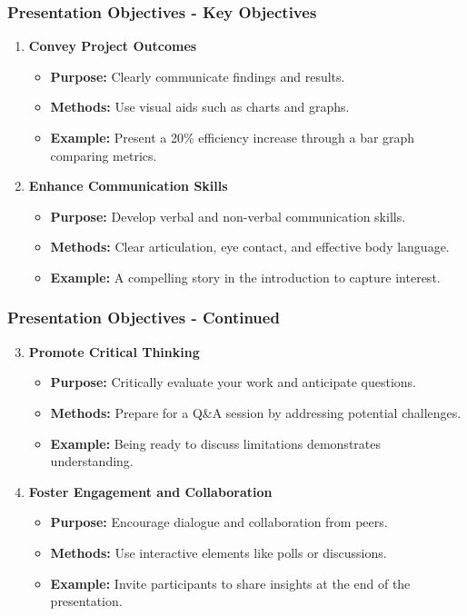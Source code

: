 \documentclass[aspectratio=169]{beamer}
\begin{document}
\begin{frame}[fragile]
    \frametitle{Presentation Objectives - Key Objectives}
    \begin{enumerate}
        \item \textbf{Convey Project Outcomes}
            \begin{itemize}
                \item \textbf{Purpose:} Clearly communicate findings and results.
                \item \textbf{Methods:} Use visual aids such as charts and graphs.
                \item \textbf{Example:} Present a 20\% efficiency increase through a bar graph comparing metrics.
            \end{itemize}
        
        \item \textbf{Enhance Communication Skills}
            \begin{itemize}
                \item \textbf{Purpose:} Develop verbal and non-verbal communication skills.
                \item \textbf{Methods:} Clear articulation, eye contact, and effective body language.
                \item \textbf{Example:} A compelling story in the introduction to capture interest.
            \end{itemize}
    \end{enumerate}
\end{frame}

\begin{frame}[fragile]
    \frametitle{Presentation Objectives - Continued}
    \begin{enumerate}
        \setcounter{enumi}{2} %
        \item \textbf{Promote Critical Thinking}
            \begin{itemize}
                \item \textbf{Purpose:} Critically evaluate your work and anticipate questions.
                \item \textbf{Methods:} Prepare for a Q\&A session by addressing potential challenges.
                \item \textbf{Example:} Being ready to discuss limitations demonstrates understanding.
            \end{itemize}
        
        \item \textbf{Foster Engagement and Collaboration}
            \begin{itemize}
                \item \textbf{Purpose:} Encourage dialogue and collaboration from peers.
                \item \textbf{Methods:} Use interactive elements like polls or discussions.
                \item \textbf{Example:} Invite participants to share insights at the end of the presentation.
            \end{itemize}
    \end{enumerate}
\end{frame}
\end{document}
